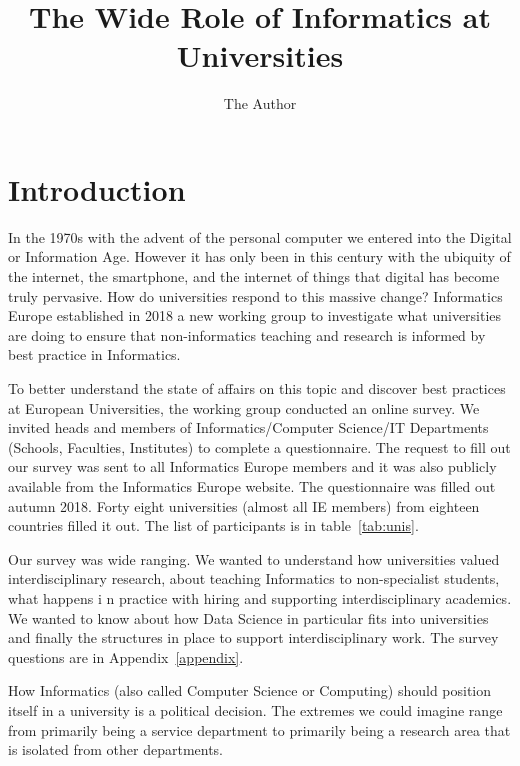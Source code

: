 \documentclass[11pt]{amsart}
\title{The Wide Role of Informatics at Universities}
\author{The Author}
\begin{document}
\maketitle
\section{Introduction}

In the 1970s with the advent of the personal computer we entered into the Digital or Information Age. However it has only been in this century with the ubiquity of the internet, the smartphone, and the internet of things that digital has become truly pervasive. How do universities respond to this massive change? Informatics Europe established in 2018 a new working group to investigate what universities are doing to ensure that non-informatics teaching and research is informed by best practice in Informatics.

To better understand the state of affairs on this topic and discover best practices at European Universities, the working group conducted an online survey. We invited heads and members of Informatics/Computer Science/IT Departments (Schools, Faculties, Institutes) to complete a questionnaire. The request to fill out our survey was sent to all Informatics Europe members and it was also publicly available from the Informatics Europe website. The questionnaire was filled out autumn 2018. Forty eight universities (almost all IE members) from eighteen countries filled it out. The list of participants is in table~\ref{tab:unis}.

Our survey was wide ranging. We wanted to understand how universities valued interdisciplinary research, about teaching Informatics to non-specialist students, what happens i n practice with hiring and supporting interdisciplinary academics. We wanted to know about how Data Science in particular fits into universities and finally the structures in place to support interdisciplinary work. The survey questions are in Appendix~\ref{appendix}. 

How Informatics (also called Computer Science or Computing) should position itself in a university is a political decision. The extremes we could imagine range from primarily being a service department to primarily being a research area that is isolated from other departments.
\end{document}
